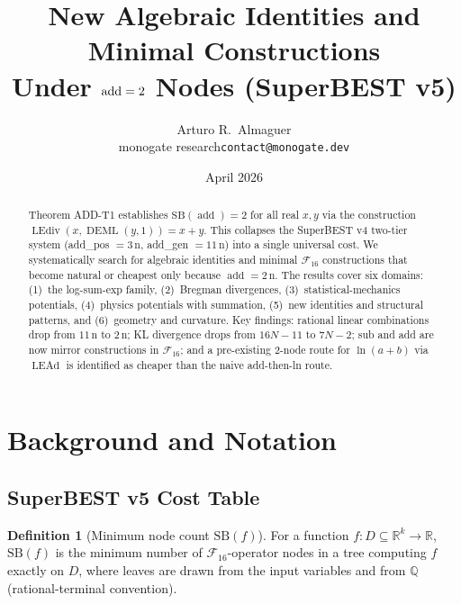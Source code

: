 \documentclass[12pt,a4paper]{article}
\title{New Algebraic Identities and Minimal Constructions\\
       Under $\addop = 2$ Nodes (SuperBEST v5)}
\author{Arturo R.\ Almaguer\\
  \small monogate research\quad\texttt{contact@monogate.dev}}
\date{April 2026}
\theoremstyle{definition}
\newtheorem{definition}[theorem]{Definition}
\newcommand{\DEML}{\operatorname{DEML}}
\newcommand{\LEAd}{\operatorname{LEAd}}
\newcommand{\LEdiv}{\operatorname{LEdiv}}
\newcommand{\addop}{\operatorname{add}}
\newcommand{\SB}{\mathrm{SB}}
\newcommand{\F}{\mathcal{F}_{16}}
\newcommand{\R}{\mathbb{R}}
\begin{document}
\maketitle

\begin{abstract}
Theorem ADD-T1 establishes $\SB(\addop) = 2$ for all real $x, y$ via the
construction $\LEdiv(x,\DEML(y,1)) = x + y$.
This collapses the SuperBEST v4 two-tier system (add\_pos $= 3\,\text{n}$,
add\_gen $= 11\,\text{n}$) into a single universal cost.
We systematically search for algebraic identities and minimal $\mathcal{F}_{16}$
constructions that become natural or cheapest only because $\addop = 2\,\text{n}$.
The results cover six domains: (1)~the log-sum-exp family, (2)~Bregman divergences,
(3)~statistical-mechanics potentials, (4)~physics potentials with summation,
(5)~new identities and structural patterns, and (6)~geometry and curvature.
Key findings: rational linear combinations drop from $11\,\text{n}$ to $2\,\text{n}$;
KL divergence drops from $16N{-}11$ to $7N{-}2$; sub and add are now mirror
constructions in $\F$; and a pre-existing 2-node route for $\ln(a+b)$ via $\LEAd$
is identified as cheaper than the naive add-then-ln route.
\end{abstract}

\tableofcontents

\section{Background and Notation}
\label{sec:background}

\subsection{SuperBEST v5 Cost Table}

\begin{definition}[Minimum node count $\SB(f)$]
For a function $f : D \subseteq \R^k \to \R$, $\SB(f)$ is the minimum number
of $\mathcal{F}_{16}$-operator nodes in a tree computing $f$ exactly on $D$,
where leaves are drawn from the input variables and from $\mathbb{Q}$
(rational-terminal convention).
\end{definition}
\end{document}

